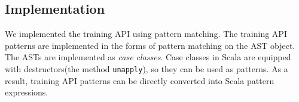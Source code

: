 \subsection{Implementation}

We implemented the training API using pattern matching.
The training API patterns are implemented in the forms of pattern matching
on the AST object. The ASTs are implemented as \textit{case classes}.
Case classes in Scala are equipped with destructors(the method {\tt unapply}),
so they can be used as patterns. 
As a result, training API patterns can be directly converted into
Scala pattern expressions.
